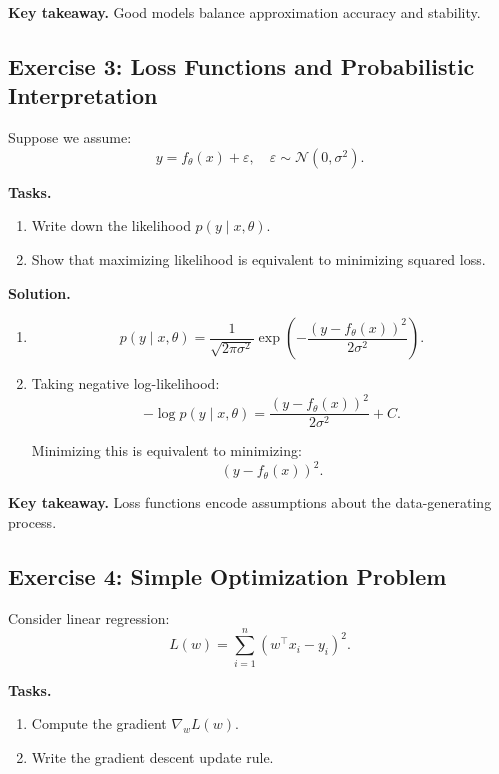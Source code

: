 \medskip

\noindent
\textbf{Key takeaway.}  
Good models balance approximation accuracy and stability.

\subsection{Exercise 3: Loss Functions and Probabilistic Interpretation}

Suppose we assume:
\[
y = f_\theta(x) + \varepsilon, \quad \varepsilon \sim \mathcal{N}(0, \sigma^2).
\]

\medskip

\noindent
\textbf{Tasks.}
\begin{enumerate}
    \item Write down the likelihood $p(y \mid x, \theta)$.
    \item Show that maximizing likelihood is equivalent to minimizing squared loss.
\end{enumerate}

\medskip

\noindent
\textbf{Solution.}

\begin{enumerate}
    \item 
    \[
    p(y \mid x, \theta)
    =
    \frac{1}{\sqrt{2\pi \sigma^2}}
    \exp\left(-\frac{(y - f_\theta(x))^2}{2\sigma^2}\right).
    \]

    \item Taking negative log-likelihood:
    \[
    -\log p(y \mid x, \theta)
    =
    \frac{(y - f_\theta(x))^2}{2\sigma^2} + C.
    \]

    Minimizing this is equivalent to minimizing:
    \[
    (y - f_\theta(x))^2.
    \]
\end{enumerate}

\medskip

\noindent
\textbf{Key takeaway.}  
Loss functions encode assumptions about the data-generating process.

\subsection{Exercise 4: Simple Optimization Problem}

Consider linear regression:
\[
L(w) = \sum_{i=1}^n (w^\top x_i - y_i)^2.
\]

\medskip

\noindent
\textbf{Tasks.}
\begin{enumerate}
    \item Compute the gradient $\nabla_w L(w)$.
    \item Write the gradient descent update rule.
\end{enumerate}

